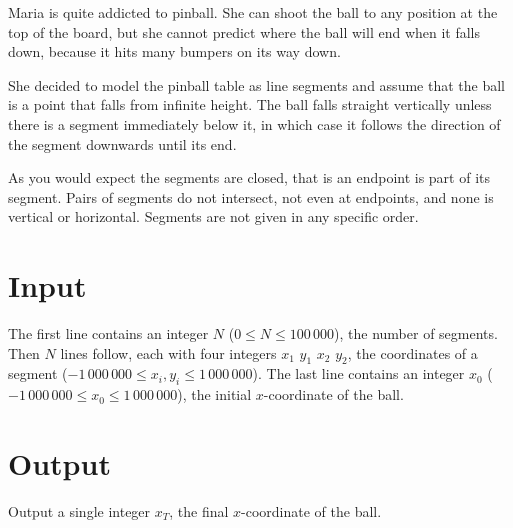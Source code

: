 
Maria is quite addicted to pinball. She can shoot the ball to any position at the top of the board,
but she cannot predict where the ball will end when it falls down, because it hits many bumpers on
its way down.

She decided to model the pinball table as line segments and assume that the ball is a point that falls from infinite height. The ball falls straight vertically unless there is a segment immediately below it, in which case it follows the direction of the segment downwards until its end.

As you would expect the segments are closed, that is an endpoint is part of its segment. Pairs of segments do not intersect, not even at endpoints, and none is vertical or horizontal. Segments are not given in any specific order.

\section*{Input}

The first line contains an integer $N$ ($0\leq N \leq 100\,000$), the number of segments. Then $N$ lines follow, each with four integers $x_1$ $y_1$ $x_2$ $y_2$, the coordinates of a segment ($-1\,000\,000 \leq x_i,y_i \leq 1\,000\,000$). The last line contains an integer $x_0$ ($-1\,000\,000 \leq x_0 \leq 1\,000\,000$), the initial $x$-coordinate of the ball.

\section*{Output}

Output a single integer $x_T$, the final $x$-coordinate of the ball.

